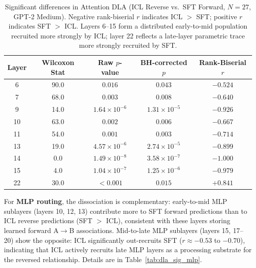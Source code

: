 \documentclass[11pt]{article}
\begin{document}
\begin{table}[H]
\centering
\caption{Significant differences in Attention DLA (ICL Reverse vs.\ SFT
Forward, $N=27$, GPT-2 Medium). Negative rank-biserial $r$ indicates ICL
$>$ SFT; positive $r$ indicates SFT $>$ ICL. Layers 6--15 form a distributed
early-to-mid population recruited more strongly by ICL; layer 22 reflects a
late-layer parametric trace more strongly recruited by SFT.}
\label{tab:dla_sig}
\begin{tabular}{ccccc}
\toprule
\textbf{Layer} & \textbf{Wilcoxon Stat} & \textbf{Raw $p$-value} & \textbf{BH-corrected $p$} & \textbf{Rank-Biserial $r$} \\
\midrule
 6 &  90.0 & $0.016$            & $0.043$             & $-0.524$ \\
 7 &  68.0 & $0.003$            & $0.008$             & $-0.640$ \\
 9 &  14.0 & $1.64\times10^{-6}$ & $1.31\times10^{-5}$ & $-0.926$ \\
10 &  63.0 & $0.002$            & $0.006$             & $-0.667$ \\
11 &  54.0 & $0.001$            & $0.003$             & $-0.714$ \\
13 &  19.0 & $4.57\times10^{-6}$ & $2.74\times10^{-5}$ & $-0.899$ \\
14 &   0.0 & $1.49\times10^{-8}$ & $3.58\times10^{-7}$ & $-1.000$ \\
15 &   4.0 & $1.04\times10^{-7}$ & $1.25\times10^{-6}$ & $-0.979$ \\
22 &  30.0 & $<0.001$           & $0.015$             & $+0.841$ \\
\bottomrule
\end{tabular}
\end{table}

For \textbf{MLP routing}, the dissociation is complementary: early-to-mid MLP
sublayers (layers 10, 12, 13) contribute more to SFT forward predictions than
to ICL reverse predictions (SFT $>$ ICL), consistent with these layers storing
learned forward A$\to$B associations. Mid-to-late MLP sublayers (layers 15,
17--20) show the opposite: ICL significantly out-recruits SFT ($r \approx
-0.53$ to $-0.70$), indicating that ICL actively recruits late MLP layers as a
processing substrate for the reversed relationship. Details are in
Table~\ref{tab:dla_sig_mlp}.
\end{document}
